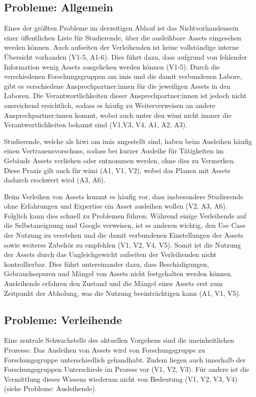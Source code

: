 \subsection{Probleme: Allgemein}
\label{section:probleme-allgemein}
Eines der größten Probleme im derzeitigen Ablauf ist das Nichtvorhandensein
einer öffentlichen Liste für Studierende, über die ausleihbare Assets eingesehen
werden können. Auch aufseiten der Verleihenden ist keine vollständige interne
Übersicht vorhanden (V1-5, A1-6). Dies führt dazu, dass aufgrund von fehlender
Information wenig Assets ausgeliehen werden können (V1-5). Durch die
verschiedenen Forschungsgruppen am \ac{imis} und die damit verbundenen Labore,
gibt es verschiedene Ansprechpartner:innen für die jeweiligen Assets in den
Laboren. Die Verantwortlichkeiten dieser Ansprechpartner:innen ist jedoch nicht
ausreichend ersichtlich, sodass es häufig zu Weiterverweisen an andere
Ansprechpartner:innen kommt, wobei auch unter den \ac{wimi} nicht immer die
Verantwortlichkeiten bekannt sind (V1,V3, V4, A1, A2, A3).

Studierende, welche als \ac{hiwi} am \ac{imis} angestellt sind, haben beim
Ausleihen häufig einen Vertrauensvorschuss, sodass bei kurzer Ausleihe für
Tätigkeiten im Gebäude Assets verliehen oder entnommen werden, ohne dies zu
Vermerken. Diese Praxis gilt auch für \ac{wimi} (A1, V1, V2), wobei das Planen
mit Assets dadurch erschwert wird (A3, A6).

Beim Verleihen von Assets kommt es häufig vor, dass insbesondere Studierende
ohne Erfahrungen und Expertise ein Asset ausleihen wollen (V2, A3, A6). Folglich
kann dies schnell zu Problemen führen. Während einige Verleihende auf die
Selbstaneignung und Google verweisen, ist es anderen wichtig, den Use Case der
Nutzung zu verstehen und die damit verbundenen Einstellungen der Assets sowie
weiteres Zubehör zu empfehlen (V1, V2, V4, V5). Somit ist die Nutzung der Assets
durch das Ungleichgewicht aufseiten der Verleihenden nicht kontrollierbar. Dies
führt untereinander dazu, dass Beschädigungen, Gebrauchsspuren und Mängel von
Assets nicht festgehalten werden können. Ausleihende erfahren den Zustand und
die Mängel eines Assets erst zum Zeitpunkt der Abholung, was die Nutzung
beeinträchtigen kann (A1, V1, V5).

\subsection{Probleme: Verleihende}
\label{section:probleme-verleihende}
Eine zentrale Schwachstelle des aktuellen Vorgehens sind die uneinheitlichen
Prozesse. Das Ausleihen von Assets wird von Forschungsgruppe zu Forschungsgruppe
unterschiedlich gehandhabt. Zudem liegen auch innerhalb der Forschungsgruppen
Unterschiede im Prozess vor (V1, V2, V3). Für andere ist die Vermittlung dieses
Wissens wiederum nicht von Bedeutung (V1, V2, V3, V4) (siehe Probleme:
Ausleihende).

